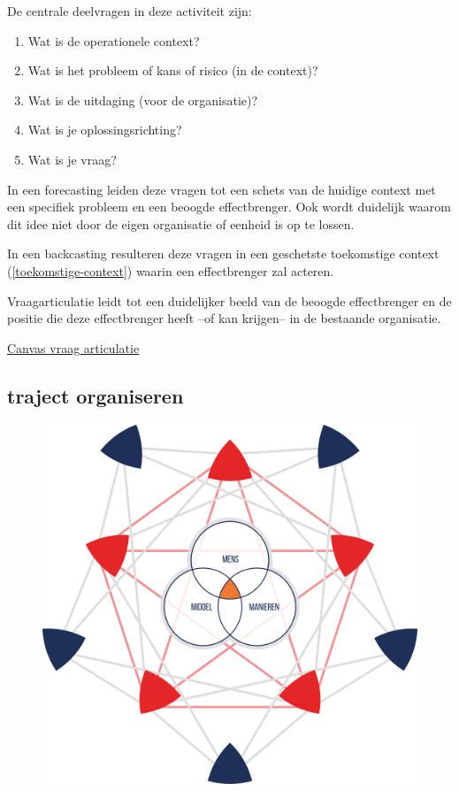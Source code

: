 \documentclass[
]{book}
\providecommand{\tightlist}{%
  \setlength{\itemsep}{0pt}\setlength{\parskip}{0pt}}
\begin{document}
De centrale deelvragen in deze activiteit zijn:

\begin{enumerate}
\def\labelenumi{\arabic{enumi}.}
\tightlist
\item
  Wat is de operationele context?
\item
  Wat is het probleem of kans of risico (in de context)?
\item
  Wat is de uitdaging (voor de organisatie)?
\item
  Wat is je oplossingsrichting?
\item
  Wat is je vraag?
\end{enumerate}

In een forecasting leiden deze vragen tot een schets van de huidige context met een specifiek probleem en een beoogde effectbrenger. Ook wordt duidelijk waarom dit idee niet door de eigen organisatie of eenheid is op te lossen.

In een backcasting resulteren deze vragen in een geschetste toekomstige context (\ref{toekomstige-context}) waarin een effectbrenger zal acteren.

Vraagarticulatie leidt tot een duidelijker beeld van de beoogde effectbrenger en de positie die deze effectbrenger heeft --of kan krijgen-- in de bestaande organisatie.

\href{data/images/20200116-CDE-canvassen-vraagarticulatie.png}{Canvas vraag articulatie}

\hypertarget{traject-organiseren}{%
\subsection{traject organiseren}\label{traject-organiseren}}

\begin{figure}

{\centering \includegraphics[width=350pt]{data/images/20210401-MDI-trajectorganiseren} 

}

\caption{ }\label{fig:unnamed-chunk-10}
\end{figure}
\end{document}
